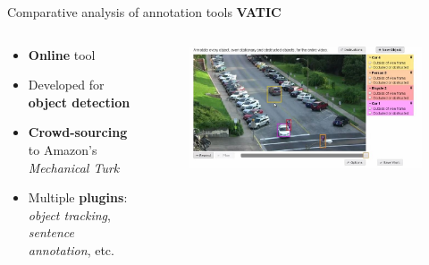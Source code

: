 \documentclass{beamer}
\begin{document}
\begin{tframe}{Comparative analysis of annotation tools}
\textbf{VATIC} 
\begin{columns}[t] %
\begin{column}{.45\textwidth}
\begin{itemize}
\item \textbf{Online} tool
\vspace{0.1cm}
\item Developed for \textbf{object detection}
\vspace{0.1cm}
\item \textbf{Crowd-sourcing} to Amazon's \emph{Mechanical Turk}
\vspace{0.1cm}
\item Multiple \textbf{plugins}: \emph{object tracking}, \emph{sentence annotation}, etc.
\end{itemize}
\end{column}%
\begin{column}{.3\textwidth}
\begin{figure}[h]
\centering
\includegraphics[width=1.2\textwidth]{images/vatic.jpg}
\end{figure}
\end{column}%
\end{columns}
\end{tframe}
\end{document}

